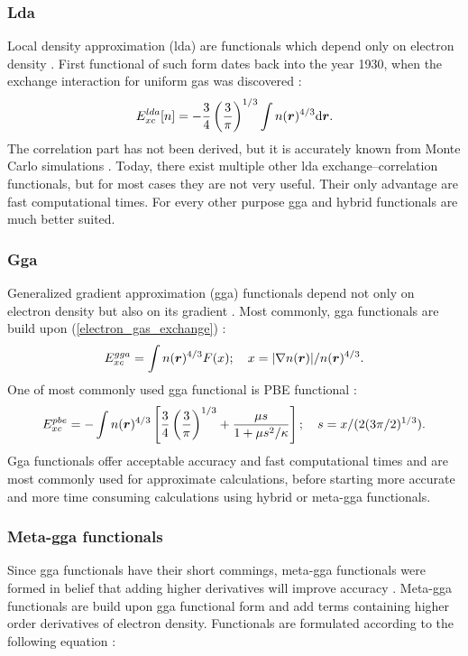 \documentclass[openany, longbibliography,slovene,a4paper,12pt]{article}
\def\vec#1{\mbox{\boldmath$#1$}}
\newcommand{\dif}{\mathrm{d}}
\begin{document}
\subsubsection{Lda}
Local density approximation (lda) are functionals which depend only on
 electron density \cite{challenges_den_fun_theor, presc_desig_selec_densit_funct_approx}.
First functional of such form dates back into
the year 1930, when the exchange interaction for uniform gas was discovered
\cite{challenges_den_fun_theor} :
\begin{equation} \label{electron_gas_exchange}
E_{xc}^{lda}[n]=-\frac{3}{4}\left( \frac{3}{\pi} \right)^{1/3}\int n(\vec r)^{4/3} \dif \vec r.
\end{equation}
The correlation part has not been derived, but it is accurately known from Monte
Carlo simulations \cite{presc_desig_selec_densit_funct_approx}.
Today, there exist multiple other lda exchange--correlation functionals, but for most cases
they are not very useful. Their only advantage are fast computational times.
For every other purpose gga and hybrid functionals are much better suited.

\subsubsection{Gga}
Generalized gradient approximation (gga) functionals
depend not only on electron density but also on its gradient
\cite{challenges_den_fun_theor}. Most commonly, gga functionals are build upon (\ref{electron_gas_exchange}) \cite{challenges_den_fun_theor}:
\begin{equation}
  E_{xc}^{gga}=\int n(\vec r)^{4/3}F(x);\quad x=|\nabla n(\vec r)|/n(\vec r)^{4/3}.
\end{equation}
One of most commonly used gga functional is PBE functional
\cite{challenges_den_fun_theor} \cite{challenges_den_fun_theor}:
\begin{equation}
  E_{xc}^{pbe}=-\int  n(\vec r)^{4/3}\left[ \frac{3}{4}\left(\frac{3}{\pi}\right)^{1/3} + \frac{\mu s}{1+ \mu s^2/\kappa} \right]; \quad s=x/(2(3\pi/2)^{1/3}).
\end{equation}
Gga functionals offer acceptable accuracy and fast computational times and are
most commonly used for approximate calculations, before starting more accurate
and more time consuming calculations using hybrid or meta-gga functionals.

\subsubsection{Meta-gga functionals}
Since gga functionals have their short commings, meta-gga functionals were formed
in belief that adding higher derivatives will improve accuracy
\cite{challenges_den_fun_theor}. Meta-gga functionals are build upon gga
functional form and add terms containing higher order derivatives of electron
density. Functionals are formulated according to the following equation
\cite{challenges_den_fun_theor}:
\end{document}
